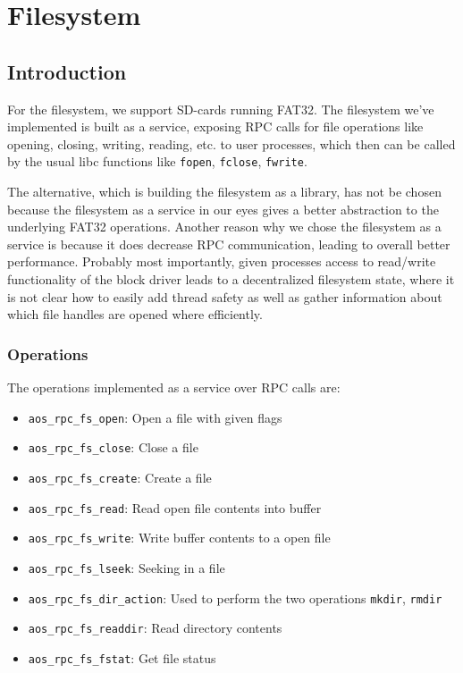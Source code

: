 \chapter{Filesystem}
\section{Introduction}
For the filesystem, we support SD-cards running FAT32. The filesystem we've implemented 
is built as a service, exposing RPC calls for file operations like opening, closing, writing, reading, etc. 
to user processes, which then can be called by the usual libc functions like \texttt{fopen}, \texttt{fclose}, \texttt{fwrite}.

The alternative, which is building the filesystem as a library, has not be chosen because the filesystem as a service in our eyes
gives a better abstraction to the underlying FAT32 operations. Another reason why we chose the filesystem as a service
is because it does decrease RPC communication, leading to overall better performance. Probably most importantly, given processes
access to read/write functionality of the block driver leads to a decentralized filesystem state, where it is not clear how to easily
add thread safety as well as gather information about which file handles are opened where efficiently.

\subsection{Operations}
The operations implemented as a service over RPC calls are:
\begin{itemize}
    \item \texttt{aos\_rpc\_fs\_open}: Open a file with given flags
    \item \texttt{aos\_rpc\_fs\_close}: Close a file
    \item \texttt{aos\_rpc\_fs\_create}: Create a file
    \item \texttt{aos\_rpc\_fs\_read}: Read open file contents into buffer
    \item \texttt{aos\_rpc\_fs\_write}: Write buffer contents to a open file
    \item \texttt{aos\_rpc\_fs\_lseek}: Seeking in a file
    \item \texttt{aos\_rpc\_fs\_dir\_action}: Used to perform the two operations \texttt{mkdir}, \texttt{rmdir}
    \item \texttt{aos\_rpc\_fs\_readdir}: Read directory contents
    \item \texttt{aos\_rpc\_fs\_fstat}: Get file status
\end{itemize}

